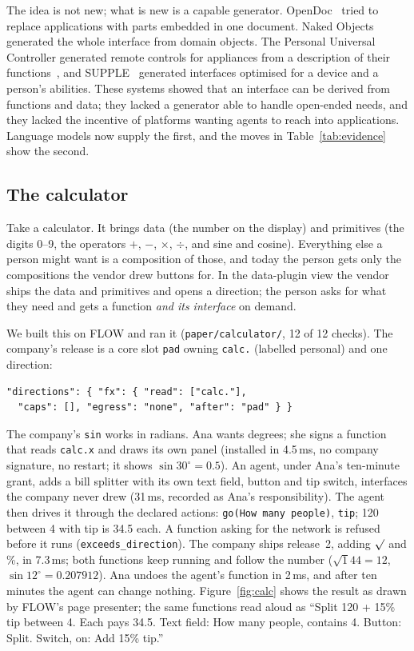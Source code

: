 \documentclass[10pt,twocolumn]{article}
\newcommand{\code}[1]{\texttt{#1}}
\newcommand{\ms}{\,ms\xspace}
\begin{document}
The idea is not new; what is new is a capable generator. OpenDoc~\cite{apple1996opendoc} tried to
replace applications with parts embedded in one document. Naked Objects~\cite{pawson2004naked}
generated the whole interface from domain objects. The Personal Universal Controller generated remote
controls for appliances from a description of their functions~\cite{nichols2002puc}, and
SUPPLE~\cite{gajos2004supple} generated interfaces optimised for a device and a person's abilities.
These systems showed that an interface can be derived from functions and data; they lacked a
generator able to handle open-ended needs, and they lacked the incentive of platforms wanting agents
to reach into applications. Language models now supply the first, and the moves in
Table~\ref{tab:evidence} show the second.

\subsection{The calculator}

Take a calculator. It brings data (the number on the display) and primitives (the digits 0--9, the
operators $+$, $-$, $\times$, $\div$, and sine and cosine). Everything else a person might want is a
composition of those, and today the person gets only the compositions the vendor drew buttons for.
In the data-plugin view the vendor ships the data and primitives and opens a direction; the person
asks for what they need and gets a function \emph{and its interface} on demand.

We built this on FLOW and ran it (\code{paper/calculator/}, 12 of 12 checks). The company's release
is a core slot \code{pad} owning \code{calc.} (labelled personal) and one direction:
\begin{lstlisting}
"directions": { "fx": { "read": ["calc."],
  "caps": [], "egress": "none", "after": "pad" } }
\end{lstlisting}
The company's \code{sin} works in radians. Ana wants degrees; she signs a function that reads
\code{calc.x} and draws its own panel (installed in 4.5\ms, no company signature, no restart; it shows
$\sin 30^\circ = 0.5$). An agent, under Ana's ten-minute grant, adds a bill splitter with its own text
field, button and tip switch, interfaces the company never drew (31\ms, recorded as Ana's
responsibility). The agent then drives it through the declared actions: \code{go(How many people)},
\code{tip}; 120 between 4 with tip is 34.5 each. A function asking for the network is refused before
it runs (\code{exceeds\_direction}). The company ships release~2, adding $\surd$ and \%, in 7.3\ms; both
functions keep running and follow the number ($\surd 144 = 12$, $\sin 12^\circ = 0.207912$). Ana undoes
the agent's function in 2\ms, and after ten minutes the agent can change nothing. Figure~\ref{fig:calc}
shows the result as drawn by FLOW's page presenter; the same functions read aloud as ``Split 120 +
15\% tip between 4. Each pays 34.5. Text field: How many people, contains 4. Button: Split. Switch, on:
Add 15\% tip.''
\end{document}
